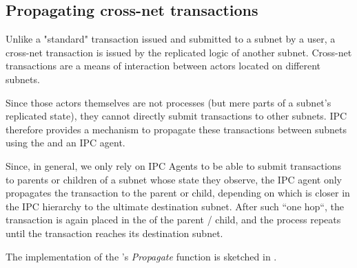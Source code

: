 \subsection{Propagating cross-net transactions}
\label{sec:cross-net-tx}

Unlike a "standard" transaction issued and submitted to a subnet by a user,
a cross-net transaction is issued by the replicated logic of another subnet.
Cross-net transactions are a means of interaction between actors located on different subnets.

Since those actors themselves are not processes (but mere parts of a subnet's replicated state),
they cannot directly submit transactions to other subnets.
IPC therefore provides a mechanism to propagate these transactions between subnets using the \postoffice and an IPC agent.
 

Since, in general, we only rely on IPC Agents to be able to submit transactions to parents or children of a subnet whose state they observe,
the IPC agent only propagates the transaction to the parent or child, depending on which is closer in the IPC hierarchy to the ultimate destination subnet.
After such ``one hop``, the transaction is again placed in the \postoffice of the parent / child, and the process repeats until the transaction reaches its destination subnet.

The implementation of the \gw's \emph{Propagate} function is sketched in .



